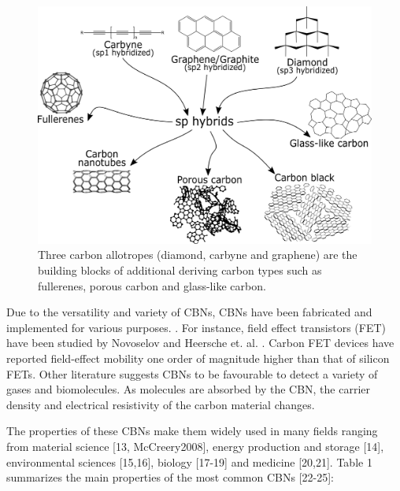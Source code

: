 \begin{figure}[th]
\centering
\includegraphics[scale=0.40]{./Figures/carbonAllotropes.png}
\decoRule
\caption[Carbon Allotropes]{Three carbon allotropes (diamond, carbyne and graphene) are the building blocks of additional deriving carbon types such as fullerenes, porous carbon and glass-like carbon.}
\label{fig:carbonAllotropes}
\end{figure}

Due to the versatility and variety of CBNs, CBNs have been fabricated and implemented for various purposes. \cite{Geim2011, Katsnelson2008, Li2008, Geim2007, Geim2009, Siddiqui2019}. For instance, field effect transistors (FET) have been studied by Novoselov \cite{Novoselov2004} and Heersche et. al. \cite{Heersche2007}. Carbon FET devices have reported field-effect mobility one order of magnitude higher than that of silicon FETs. Other literature suggests CBNs to be favourable to detect a variety of gases and biomolecules. \cite{} As molecules are absorbed by the CBN, the carrier density and electrical resistivity of the carbon material changes. 


The properties of these CBNs make them widely used in many
fields ranging from material science [13, McCreery2008], energy production and storage [14], environmental sciences [15,16], biology [17-19] and medicine [20,21]. Table 1 summarizes the main properties of the most common CBNs [22-25]:


